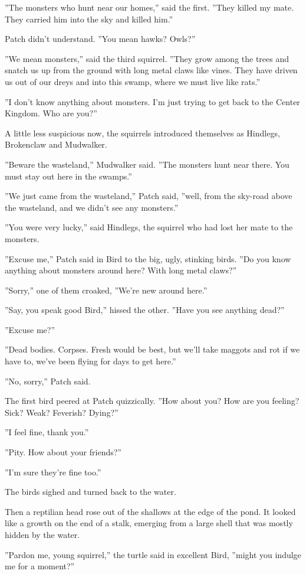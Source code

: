 \documentclass[12pt]{book}
\begin{document}
 ''The monsters who hunt near our homes,'' said the first. ''They killed my mate. They carried him into the sky and killed him.''\par
 Patch didn't understand. ''You mean hawks? Owls?''\par
 ''We mean monsters,'' said the third squirrel. ''They grow among the trees and snatch us up from the ground with long metal claws like vines. They have driven us out of our dreys and into this swamp, where we must live like rats.''\par
 ''I don't know anything about monsters. I'm just trying to get back to the Center Kingdom. Who are you?''\par
 A little less suspicious now, the squirrels introduced themselves as Hindlegs, Brokenclaw and Mudwalker.\par
 ''Beware the wasteland,'' Mudwalker said. ''The monsters hunt near there. You must stay out here in the swamps.''\par
 ''We just came from the wasteland,'' Patch said, ''well, from the sky-road above the wasteland, and we didn't see any monsters.''\par
 ''You were very lucky,'' said Hindlegs, the squirrel who had lost her mate to the monsters. \par
 ''Excuse me,'' Patch said in Bird to the big, ugly, stinking birds. ''Do you know anything about monsters around here? With long metal claws?''\par
 ''Sorry,'' one of them croaked, ''We're new around here.''\par
 ''Say, you speak good Bird,'' hissed the other. ''Have you see anything dead?''\par
 ''Excuse me?''\par
 ''Dead bodies. Corpses. Fresh would be best, but we'll take maggots and rot if we have to, we've been flying for days to get here.''\par
 ''No, sorry,'' Patch said.\par
 The first bird peered at Patch quizzically. ''How about you? How are you feeling? Sick? Weak? Feverish? Dying?''\par
''I feel fine, thank you.''\par
''Pity. How about your friends?''\par
''I'm sure they're fine too.''\par
The birds sighed and turned back to the water.\par
Then a reptilian head rose out of the shallows at the edge of the pond. It looked like a growth on the end of a stalk, emerging from a large shell that was mostly hidden by the water.\par
''Pardon me, young squirrel,'' the turtle said in excellent Bird, ''might you indulge me for a moment?''\par
\end{document}
